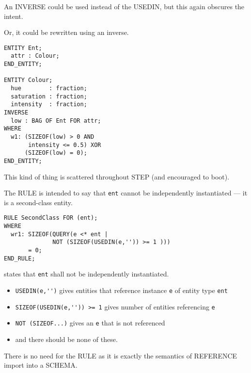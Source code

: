 \begin{remarks}
\remintro
{}

    An INVERSE could be used instead of the USEDIN, but this again obscures
the intent.

\remend
\end{remarks}

\clearpage

Or, it could be rewritten using an inverse.

\begin{verbatim}
ENTITY Ent;
  attr : Colour;
END_ENTITY;

ENTITY Colour;
  hue        : fraction;
  saturation : fraction;
  intensity  : fraction;
INVERSE
  low : BAG OF Ent FOR attr;
WHERE
  w1: (SIZEOF(low) > 0 AND 
       intensity <= 0.5) XOR
      (SIZEOF(low) = 0);
END_ENTITY;
\end{verbatim}


\begin{remarks}
\remintro
{}

   This kind of thing is scattered throughout STEP 
(and encouraged to boot).

    The RULE is intended to say that \texttt{ent} cannot be
independently instantiated --- it is a second-class entity.

\remend
\end{remarks}


\begin{verbatim}
RULE SecondClass FOR (ent);
WHERE
  wr1: SIZEOF(QUERY(e <* ent |
              NOT (SIZEOF(USEDIN(e,'')) >= 1 )))
       = 0;
END_RULE;
\end{verbatim}
states that \texttt{ent} shall not be independently instantiated.
\begin{itemize}
\item \verb|USEDIN(e,'')| gives entities that reference instance 
      \texttt{e} of entity type \texttt{ent}
\item \verb|SIZEOF(USEDIN(e,'')) >= 1| gives number of entities 
      referencing \texttt{e}
\item \verb|NOT (SIZEOF...)| gives an \texttt{e} that is not referenced
\item and there should be none of these.
\end{itemize}

\begin{remarks}
\remintro
{}

    There is no need for the RULE as it is exactly the semantics
of REFERENCE import into a SCHEMA.

\remend
\end{remarks}


